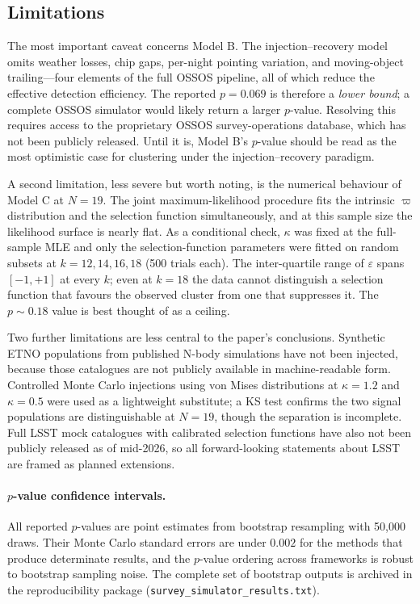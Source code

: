 \documentclass{aa}
\begin{document}
\subsection{Limitations}

The most important caveat concerns Model B. The injection--recovery model omits weather losses, chip gaps, per-night pointing variation, and moving-object trailing---four elements of the full OSSOS pipeline, all of which reduce the effective detection efficiency. The reported $p=0.069$ is therefore a \textit{lower bound}; a complete OSSOS simulator would likely return a larger $p$-value. Resolving this requires access to the proprietary OSSOS survey-operations database, which has not been publicly released. Until it is, Model B's $p$-value should be read as the most optimistic case for clustering under the injection--recovery paradigm.

A second limitation, less severe but worth noting, is the numerical behaviour of Model C at $N=19$. The joint maximum-likelihood procedure fits the intrinsic $\varpi$ distribution and the selection function simultaneously, and at this sample size the likelihood surface is nearly flat. As a conditional check, $\kappa$ was fixed at the full-sample MLE and only the selection-function parameters were fitted on random subsets at $k=12,14,16,18$ (500 trials each). The inter-quartile range of $\varepsilon$ spans $[-1,+1]$ at every $k$; even at $k=18$ the data cannot distinguish a selection function that favours the observed cluster from one that suppresses it. The $p\sim0.18$ value is best thought of as a ceiling.

Two further limitations are less central to the paper's conclusions. Synthetic ETNO populations from published N-body simulations have not been injected, because those catalogues are not publicly available in machine-readable form. Controlled Monte Carlo injections using von Mises distributions at $\kappa=1.2$ and $\kappa=0.5$ were used as a lightweight substitute; a KS test confirms the two signal populations are distinguishable at $N=19$, though the separation is incomplete. Full LSST mock catalogues with calibrated selection functions have also not been publicly released as of mid-2026, so all forward-looking statements about LSST are framed as planned extensions.

\paragraph{$p$-value confidence intervals.}
All reported $p$-values are point estimates from bootstrap resampling with 50,000 draws. Their Monte Carlo standard errors are under $0.002$ for the methods that produce determinate results, and the $p$-value ordering across frameworks is robust to bootstrap sampling noise. The complete set of bootstrap outputs is archived in the reproducibility package (\texttt{survey\_simulator\_results.txt}).
\end{document}
